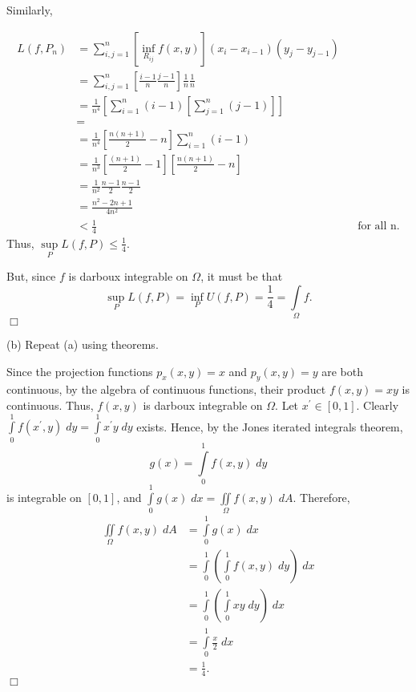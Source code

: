 \documentclass[11pt]{article}
\begin{document}
\vspace{.2in}

\noindent Similarly,

\begin{align*}
L(f,P_n)&=\sum\limits_{i,j=1}^n\left[\inf\limits_{R_{ij}}f(x,y)\right]\left(x_i-x_{i-1}\right)\left(y_j-y_{j-1}\right)\\&=\sum\limits_{i,j=1}^n\left[\frac{i-1}{n}\frac{j-1}{n}\right]\frac{1}{n}\frac{1}{n}\\&=\frac{1}{n^4}\left[\sum\limits_{i=1}^n(i-1)\left[\sum\limits_{j=1}^n(j-1)\right]\right]\\&=\\&=\frac{1}{n^4}\left[\frac{n(n+1)}{2}-n\right]\sum\limits_{i=1}^n(i-1)\\&=\frac{1}{n^3}\left[\frac{(n+1)}{2}-1\right]\left[\frac{n(n+1)}{2}-n\right]\\&=\frac{1}{n^2}\frac{n-1}{2}\frac{n-1}{2}\\&=\frac{n^2-2n+1}{4n^2}\\&<\frac{1}{4}&&\text{for all n.}
\end{align*}
\noindent Thus, $\sup\limits_PL(f,P)\leq\frac{1}{4}$.
\vspace{.2in}

\noindent But, since $f$ is darboux integrable on $\Omega$, it must be that
\[
\sup\limits_PL(f,P)=\inf\limits_PU(f,P)=\frac{1}{4}=\int\limits_\Omega f.
\]
\hfill	$\Box$

\vspace{.2in}

\noindent (b) Repeat (a) using theorems.

\vspace{.2in}

\noindent Since the projection functions $p_x(x,y)=x$ and $p_y(x,y)=y$ are both continuous, by the algebra of continuous functions, their product $f(x,y)=xy$ is continuous. Thus, $f(x,y)$ is darboux integrable on $\Omega$. Let $x^{'}\in [0,1]$. Clearly $\int\limits_0^1f(x^{'},y)\;dy=\int\limits_0^1x^{'}y\;dy$ exists. Hence, by the Jones iterated integrals theorem, 
\[
g(x)=\int\limits_0^1f(x,y)\;dy
\]
\noindent is integrable on $[0,1]$, and $\int\limits_0^1g(x)\;dx=\iint\limits_\Omega f(x,y)\;dA$. Therefore,
\begin{align*}
\iint\limits_\Omega f(x,y)\;dA&=\int\limits_0^1g(x)\;dx\\&=\int\limits_0^1\left(\int\limits_0^1f(x,y)\;dy\right)\;dx\\&=\int\limits_0^1\left(\int\limits_0^1xy\;dy\right)\;dx\\&=\int\limits_0^1\frac{x}{2}\;dx\\&=\frac{1}{4}.
\end{align*}
\hfill $\Box$
\end{document}
